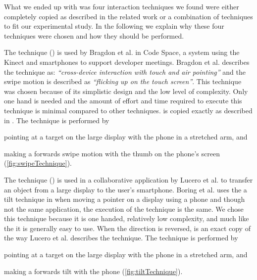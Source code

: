 What we ended up with was four interaction techniques we found were either completely copied as described in the related work or a combination of techniques to fit our experimental study.
In the following we explain why these four techniques were chosen and how they should be performed.

The \swipe technique () is used by Bragdon et al. \cite{Bragdon:2011} in Code Space, a system using the Kinect and smartphones to support developer meetings. 
Bragdon et al. describes the technique as: \emph{``cross-device interaction with touch and air pointing''} and the swipe motion is described as \emph{``flicking up on the touch screen''}. 
This technique was chosen because of its simplistic design and the low level of complexity.
Only one hand is needed and the amount of effort and time required to execute this technique is minimal compared to other techniques.
\swipe is copied exactly as described in \cite{Bragdon:2011}.
The \swipe technique is performed by 
\begin{enumerate*}[label=\itshape\roman*\upshape)]
	\item{pointing at a target on the large display with the phone in a stretched arm, and}
	\item{making a forwards swipe motion with the thumb on the phone's screen (\cref{fig:swipeTechnique}).}
\end{enumerate*}

The \tilt technique () is used in a collaborative application by Lucero et al. \cite{Lucero:2012} to transfer an object from a large display to the user's smartphone.
Boring et al. uses the a tilt technique in \cite{Boring:2009} when moving a pointer on a display using a phone and though not the same application, the execution of the technique is the same.
We chose this technique because it is one handed, relatively low complexity, and much like the \swipe it is generally easy to use.
When the direction is reversed, \tilt is an exact copy of the way Lucero et al. describes the technique.
The \tilt technique is performed by 
\begin{enumerate*}[label=\itshape\roman*\upshape)]
	\item{pointing at a target on the large display with the phone in a stretched arm, and}
	\item{making a forwards tilt with the phone (\cref{fig:tiltTechnique}).}
\end{enumerate*}

